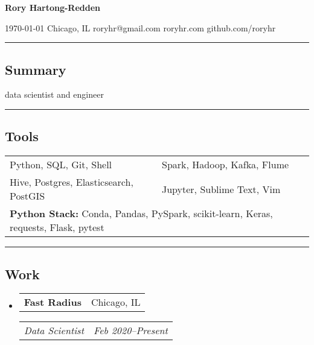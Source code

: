 \documentclass[10pt,letterpaper]{article}
\makeatletter
\newenvironment{indentsection}[1]
{\begin{list}{}%
	{\setlength{\leftmargin}{#1}}
	\item[]%
}
{\end{list}}
\newcommand{\headerrow}[2]{
\begin{tabular*}{\linewidth}{l@{\extracolsep{\fill}}r}
		#1 &
		#2 \\
	\end{tabular*}
}
\newcommand{\jobitem}[4]{\item \headerrow{\textbf{#1}}{#2}
\headerrow{\emph{#3}}{\emph{#4}}}
\makeatother
\begin{document}
{\raggedright \LARGE \bf Rory Hartong-Redden\\}

{\raggedleft 
\today \/ \textbar
\/ Chicago, IL \textbar
\/ roryhr@gmail.com \textbar
\/ roryhr.com \textbar\/   
github.com/roryhr\\
}
\hrule

\subsection*{Summary}
\begin{centering}  
data scientist and engineer \\
\end{centering}

\hrule
\subsection*{Tools}
\begin{indentsection}{\parindent}
\begin{tabular}{p{0.5\linewidth}   p{0.5\linewidth}} 
	Python, SQL, Git, Shell
	& Spark, Hadoop, Kafka, Flume\\

	Hive, Postgres, Elasticsearch, PostGIS 
	& Jupyter, Sublime Text, Vim\\ 
	
	\multicolumn{2}{l}{
		\textbf{Python Stack:} Conda, Pandas, PySpark, scikit-learn, Keras, requests, Flask, pytest
		} \\
\end{tabular}
\end{indentsection}

\hrule
\subsection*{Work}

\begin{itemize}
	\jobitem{Fast Radius}{Chicago, IL}
		     {Data Scientist}{Feb 2020--Present}
\end{itemize}
\end{document}
